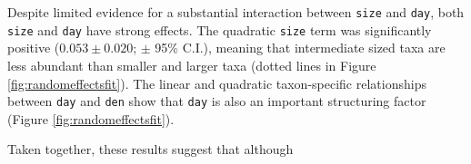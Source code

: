 \documentclass[12pt]{ecology}
\begin{document}
Despite limited evidence for a substantial interaction between \texttt{size} and \texttt{day}, both \texttt{size} and \texttt{day} have strong effects.  The quadratic \texttt{size} term was significantly positive ($0.053 \pm 0.020$; $\pm$ 95\% C.I.), meaning that intermediate sized taxa are less abundant than smaller and larger taxa (dotted lines in Figure \ref{fig:randomeffectsfit}).  The linear and quadratic taxon-specific relationships between \texttt{day} and \texttt{den} show that \texttt{day} is also an important structuring factor (Figure \ref{fig:randomeffectsfit}).

Taken together, these results suggest that although 







\end{document}
